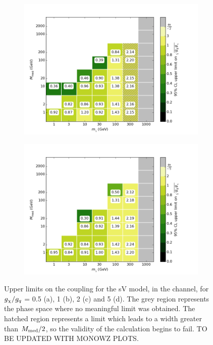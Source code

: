 \begin{figure}[h]
\begin{subfigure}[t]{0.495\textwidth}
      \includegraphics[width=1.\textwidth]{figures/grid_allpoints_SVD_rat2.png}
      \caption{}
    \end{subfigure}
    \begin{subfigure}[t]{0.495\textwidth}
      \centering
      \includegraphics[width=1.\textwidth]{figures/grid_allpoints_SVD_rat5.png}
      \caption{}
    \end{subfigure}
    \caption{Upper limits on the coupling for the sV model, in the \monoWZ channel, for $g_{\chi} / g_q$ = 0.5 (a), 1 (b), 2 (c) and 5 (d). The grey region represents the phase space where no meaningful limit was obtained. The hatched region represents a limit which leads to a width greater than $M_{\mathrm{med}} / 2$, so the validity of the calculation begins to fail. TO BE UPDATED WITH MONOWZ PLOTS.}
    \label{fig:MonoWZ_SVD_couplinglimit}
\end{figure}

